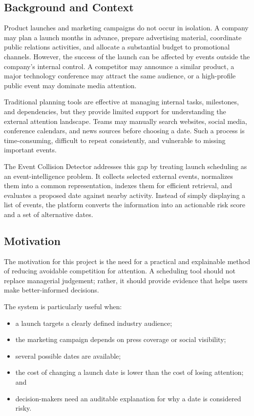 \documentclass[12pt]{article}
\begin{document}
\subsection{Background and Context}
Product launches and marketing campaigns do not occur in isolation. A company may plan a launch months in advance, prepare advertising material, coordinate public relations activities, and allocate a substantial budget to promotional channels. However, the success of the launch can be affected by events outside the company's internal control. A competitor may announce a similar product, a major technology conference may attract the same audience, or a high-profile public event may dominate media attention.

Traditional planning tools are effective at managing internal tasks, milestones, and dependencies, but they provide limited support for understanding the external attention landscape. Teams may manually search websites, social media, conference calendars, and news sources before choosing a date. Such a process is time-consuming, difficult to repeat consistently, and vulnerable to missing important events.

The Event Collision Detector addresses this gap by treating launch scheduling as an event-intelligence problem. It collects selected external events, normalizes them into a common representation, indexes them for efficient retrieval, and evaluates a proposed date against nearby activity. Instead of simply displaying a list of events, the platform converts the information into an actionable risk score and a set of alternative dates.

\subsection{Motivation}
The motivation for this project is the need for a practical and explainable method of reducing avoidable competition for attention. A scheduling tool should not replace managerial judgement; rather, it should provide evidence that helps users make better-informed decisions.

The system is particularly useful when:
\begin{itemize}[leftmargin=0.7cm]
\item a launch targets a clearly defined industry audience;
\item the marketing campaign depends on press coverage or social visibility;
\item several possible dates are available;
\item the cost of changing a launch date is lower than the cost of losing attention; and
\item decision-makers need an auditable explanation for why a date is considered risky.
\end{itemize}
\end{document}
